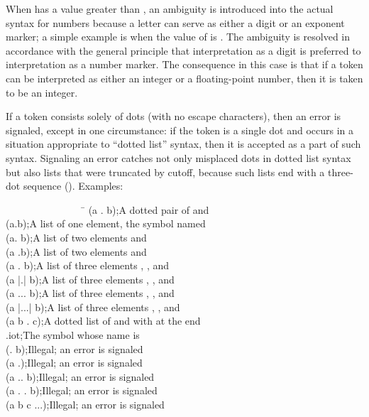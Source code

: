 When  has a value greater than , an ambiguity
is introduced into the actual syntax for numbers because a letter can serve
as either a digit or an exponent marker; a simple example is 
when the value of  is .  The ambiguity is resolved
in accordance with the general principle that interpretation
as a digit is preferred to interpretation as a number marker.
The consequence in this case is that
if a token can be interpreted as either an integer or a floating-point
number, then it is taken to be an integer.

If a token consists solely of dots (with no escape characters), then an
error is signaled, except in one circumstance: if the token is a single
dot and occurs in a situation appropriate to ``dotted list'' syntax,
then it is accepted as a part of such syntax.  Signaling an error
catches not only misplaced dots in dotted list syntax but also
lists that were truncated by  cutoff,
because such lists end with a three-dot sequence ().
Examples:
\begin{lisp}
~~~~~~~~~~~~~~~~\=\kill
(a . b)\>;{\rm A dotted pair of  and } \\
(a.b)\>;{\rm A list of one element, the symbol named } \\
(a. b)\>;{\rm A list of two elements  and } \\
(a .b)\>;{\rm A list of two elements  and } \\
(a {\Xbackslash}. b)\>;{\rm A list of three elements , , and } \\
(a |.| b)\>;{\rm A list of three elements , , and } \\
(a {\Xbackslash}... b)\>;{\rm A list of three elements , , and } \\
(a |...| b)\>;{\rm A list of three elements , , and } \\
(a b . c)\>;{\rm A dotted list of  and  with  at the end} \\
.iot\>;{\rm The symbol whose name is } \\
(. b)\>;{\rm Illegal; an error is signaled} \\
(a .)\>;{\rm Illegal; an error is signaled} \\
(a .. b)\>;{\rm Illegal; an error is signaled} \\
(a . . b)\>;{\rm Illegal; an error is signaled} \\
(a b c ...)\>;{\rm Illegal; an error is signaled}
\end{lisp}

